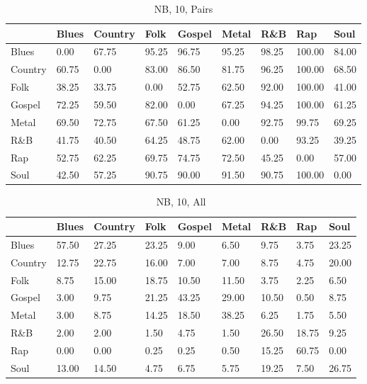 \documentclass[a4paper,oneside]{article}
\begin{document}
\begin{table}[H]\centering
\caption{NB, 10, Pairs}
\begin{tabu}{l|*{8}{l}}
 & Blues & Country & Folk & Gospel & Metal & R\&B & Rap & Soul \\ \hline
Blues & 0.00 & 67.75 & 95.25 & 96.75 & 95.25 & 98.25 & 100.00 & 84.00 \\
Country & 60.75 & 0.00 & 83.00 & 86.50 & 81.75 & 96.25 & 100.00 & 68.50 \\
Folk & 38.25 & 33.75 & 0.00 & 52.75 & 62.50 & 92.00 & 100.00 & 41.00 \\
Gospel & 72.25 & 59.50 & 82.00 & 0.00 & 67.25 & 94.25 & 100.00 & 61.25 \\
Metal & 69.50 & 72.75 & 67.50 & 61.25 & 0.00 & 92.75 & 99.75 & 69.25 \\
R\&B & 41.75 & 40.50 & 64.25 & 48.75 & 62.00 & 0.00 & 93.25 & 39.25 \\
Rap & 52.75 & 62.25 & 69.75 & 74.75 & 72.50 & 45.25 & 0.00 & 57.00 \\
Soul & 42.50 & 57.25 & 90.75 & 90.00 & 91.50 & 90.75 & 100.00 & 0.00 \\
\end{tabu}
\end{table}

\begin{table}[H]\centering
\caption{NB, 10, All}
\begin{tabu}{l|*{8}{l}}
&	Blues & Country & Folk & Gospel & Metal & R\&B & Rap & Soul \\ \hline
Blues & 57.50 & 27.25 & 23.25 & 9.00 & 6.50 & 9.75 & 3.75 & 23.25 \\
Country & 12.75 & 22.75 & 16.00 & 7.00 & 7.00 & 8.75 & 4.75 & 20.00 \\
Folk & 8.75 & 15.00 & 18.75 & 10.50 & 11.50 & 3.75 & 2.25 & 6.50 \\
Gospel & 3.00 & 9.75 & 21.25 & 43.25 & 29.00 & 10.50 & 0.50 & 8.75 \\
Metal & 3.00 & 8.75 & 14.25 & 18.50 & 38.25 & 6.25 & 1.75 & 5.50 \\
R\&B & 2.00 & 2.00 & 1.50 & 4.75 & 1.50 & 26.50 & 18.75 & 9.25 \\
Rap & 0.00 & 0.00 & 0.25 & 0.25 & 0.50 & 15.25 & 60.75 & 0.00 \\
Soul & 13.00 & 14.50 & 4.75 & 6.75 & 5.75 & 19.25 & 7.50 & 26.75 \\
\end{tabu}
\end{table}
\end{document}
